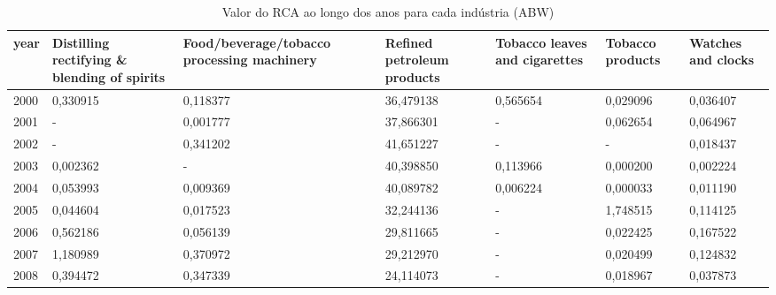 \begin{table}
\centering
\caption{Valor do RCA ao longo dos anos para cada indústria (ABW)}
\begin{tabular}{p{1cm}p{2cm}p{2cm}p{2cm}p{2cm}p{2cm}p{2cm}}
\toprule
 year &  Distilling rectifying \& blending of spirits &  Food/beverage/tobacco processing machinery &  Refined petroleum products &  Tobacco leaves and cigarettes &  Tobacco products &  Watches and clocks \\
\midrule
 2000 &                                     0,330915 &                                    0,118377 &                   36,479138 &                       0,565654 &          0,029096 &            0,036407 \\
 2001 &                                            - &                                    0,001777 &                   37,866301 &                              - &          0,062654 &            0,064967 \\
 2002 &                                            - &                                    0,341202 &                   41,651227 &                              - &                 - &            0,018437 \\
 2003 &                                     0,002362 &                                           - &                   40,398850 &                       0,113966 &          0,000200 &            0,002224 \\
 2004 &                                     0,053993 &                                    0,009369 &                   40,089782 &                       0,006224 &          0,000033 &            0,011190 \\
 2005 &                                     0,044604 &                                    0,017523 &                   32,244136 &                              - &          1,748515 &            0,114125 \\
 2006 &                                     0,562186 &                                    0,056139 &                   29,811665 &                              - &          0,022425 &            0,167522 \\
 2007 &                                     1,180989 &                                    0,370972 &                   29,212970 &                              - &          0,020499 &            0,124832 \\
 2008 &                                     0,394472 &                                    0,347339 &                   24,114073 &                              - &          0,018967 &            0,037873 \\

\end{tabular}
\end{table}
